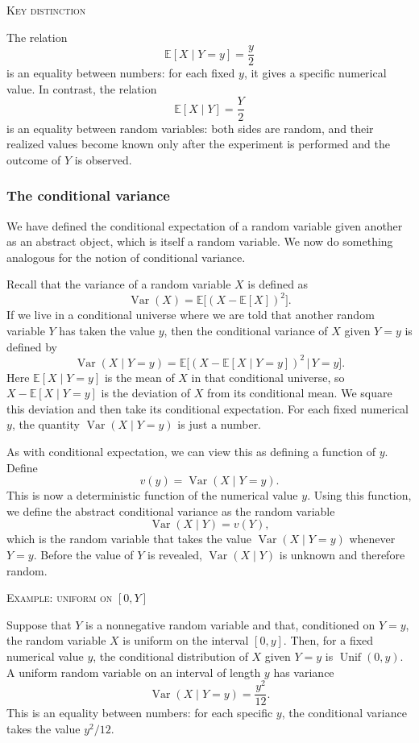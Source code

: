 \bigskip
\textsc{Key distinction}

The relation
\[
\mathbb{E}[X \mid Y = y] = \frac{y}{2}
\]
is an equality between numbers: for each fixed \(y\), it gives a specific numerical value.  
In contrast, the relation
\[
\mathbb{E}[X \mid Y] = \frac{Y}{2}
\]
is an equality between random variables: both sides are random, and their realized values become known only after the experiment is performed and the outcome of \(Y\) is observed.


\subsubsection{The conditional variance}

We have defined the conditional expectation of a random variable given another as an abstract object, which is itself a random variable.  
We now do something analogous for the notion of conditional variance.

Recall that the variance of a random variable \(X\) is defined as
\[
\operatorname{Var}(X)
=
\mathbb{E}\big[(X - \mathbb{E}[X])^{2}\big].
\]
If we live in a conditional universe where we are told that another random variable \(Y\) has taken the value \(y\), then the conditional variance of \(X\) given \(Y = y\) is defined by
\[
\operatorname{Var}(X \mid Y = y)
=
\mathbb{E}\big[(X - \mathbb{E}[X \mid Y = y])^{2} \,\big|\, Y = y\big].
\]
Here \(\mathbb{E}[X \mid Y = y]\) is the mean of \(X\) in that conditional universe, so \(X - \mathbb{E}[X \mid Y = y]\) is the deviation of \(X\) from its conditional mean.  
We square this deviation and then take its conditional expectation.  
For each fixed numerical \(y\), the quantity \(\operatorname{Var}(X \mid Y = y)\) is just a number.

As with conditional expectation, we can view this as defining a function of \(y\).  
Define
\[
v(y) = \operatorname{Var}(X \mid Y = y).
\]
This is now a deterministic function of the numerical value \(y\).  
Using this function, we define the abstract conditional variance as the random variable
\[
\operatorname{Var}(X \mid Y) = v(Y),
\]
which is the random variable that takes the value \(\operatorname{Var}(X \mid Y = y)\) whenever \(Y = y\).  
Before the value of \(Y\) is revealed, \(\operatorname{Var}(X \mid Y)\) is unknown and therefore random.

\bigskip
\textsc{Example: uniform on \([0,Y]\)}

Suppose that \(Y\) is a nonnegative random variable and that, conditioned on \(Y = y\), the random variable \(X\) is uniform on the interval \([0,y]\).  
Then, for a fixed numerical value \(y\), the conditional distribution of \(X\) given \(Y = y\) is \(\operatorname{Unif}(0,y)\).  
A uniform random variable on an interval of length \(y\) has variance
\[
\operatorname{Var}(X \mid Y = y) = \frac{y^{2}}{12}.
\]
This is an equality between numbers: for each specific \(y\), the conditional variance takes the value \(y^{2}/12\).

